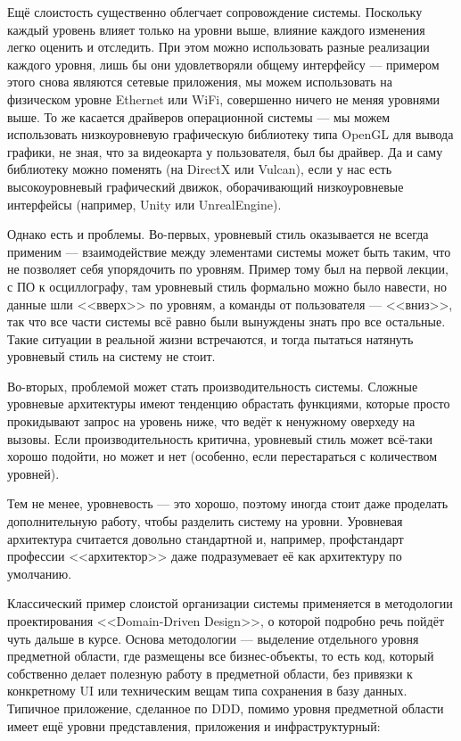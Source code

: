 \documentclass{../../text-style}
\begin{document}
Ещё слоистость существенно облегчает сопровождение системы. Поскольку каждый уровень влияет только на уровни выше, влияние каждого изменения легко оценить и отследить. При этом можно использовать разные реализации каждого уровня, лишь бы они удовлетворяли общему интерфейсу --- примером этого снова являются сетевые приложения, мы можем использовать на физическом уровне Ethernet или WiFi, совершенно ничего не меняя уровнями выше. То же касается драйверов операционной системы --- мы можем использовать низкоуровневую графическую библиотеку типа OpenGL для вывода графики, не зная, что за видеокарта у пользователя, был бы драйвер. Да и саму библиотеку можно поменять (на DirectX или Vulcan), если у нас есть высокоуровневый графический движок, оборачивающий низкоуровневые интерфейсы (например, Unity или UnrealEngine).

Однако есть и проблемы. Во-первых, уровневый стиль оказывается не всегда применим --- взаимодействие между элементами системы может быть таким, что не позволяет себя упорядочить по уровням. Пример тому был на первой лекции, с ПО к осциллографу, там уровневый стиль формально можно было навести, но данные шли <<вверх>> по уровням, а команды от пользователя --- <<вниз>>, так что все части системы всё равно были вынуждены знать про все остальные. Такие ситуации в реальной жизни встречаются, и тогда пытаться натянуть уровневый стиль на систему не стоит. 

Во-вторых, проблемой может стать производительность системы. Сложные уровневые архитектуры имеют тенденцию обрастать функциями, которые просто прокидывают запрос на уровень ниже, что ведёт к ненужному оверхеду на вызовы. Если производительность критична, уровневый стиль может всё-таки хорошо подойти, но может и нет (особенно, если перестараться с количеством уровней). 

Тем не менее, уровневость --- это хорошо, поэтому иногда стоит даже проделать дополнительную работу, чтобы разделить систему на уровни. Уровневая архитектура считается довольно стандартной и, например, профстандарт профессии <<архитектор>> даже подразумевает её как архитектуру по умолчанию.

Классический пример слоистой организации системы применяется в методологии проектирования <<Domain-Driven Design>>, о которой подробно речь пойдёт чуть дальше в курсе. Основа методологии --- выделение отдельного уровня предметной области, где размещены все бизнес-объекты, то есть код, который собственно делает полезную работу в предметной области, без привязки к конкретному UI или техническим вещам типа сохранения в базу данных. Типичное приложение, сделанное по DDD, помимо уровня предметной области имеет ещё уровни представления, приложения и инфраструктурный:
\end{document}
